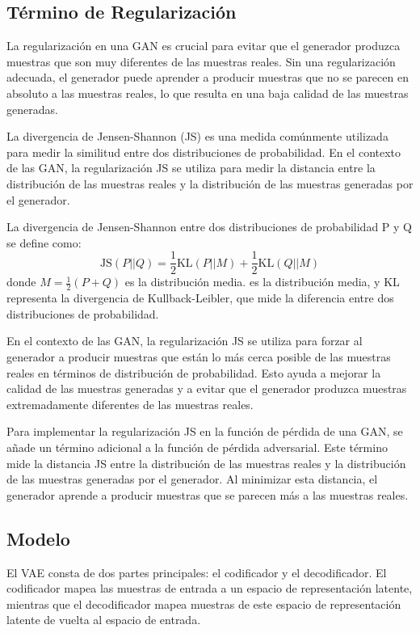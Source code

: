 \subsection{Término de Regularización}

La regularización en una GAN es crucial para evitar que el generador produzca muestras que son muy diferentes de las muestras reales. Sin una regularización adecuada, el generador puede aprender a producir muestras que no se parecen en absoluto a las muestras reales, lo que resulta en una baja calidad de las muestras generadas.

La divergencia de Jensen-Shannon (JS) es una medida comúnmente utilizada para medir la similitud entre dos distribuciones de probabilidad. En el contexto de las GAN, la regularización JS se utiliza para medir la distancia entre la distribución de las muestras reales y la distribución de las muestras generadas por el generador.

La divergencia de Jensen-Shannon entre dos distribuciones de probabilidad P y Q se define como: 
\begin{equation}
\text{JS}(P || Q) = \frac{1}{2} \text{KL}(P || M) + \frac{1}{2} \text{KL}(Q || M)
\end{equation}
donde \( M = \frac{1}{2}(P + Q) \) es la distribución media.
es la distribución media, y KL representa la divergencia de Kullback-Leibler, que mide la diferencia entre dos distribuciones de probabilidad.

En el contexto de las GAN, la regularización JS se utiliza para forzar al generador a producir muestras que están lo más cerca posible de las muestras reales en términos de distribución de probabilidad. Esto ayuda a mejorar la calidad de las muestras generadas y a evitar que el generador produzca muestras extremadamente diferentes de las muestras reales.

Para implementar la regularización JS en la función de pérdida de una GAN, se añade un término adicional a la función de pérdida adversarial. Este término mide la distancia JS entre la distribución de las muestras reales y la distribución de las muestras generadas por el generador. Al minimizar esta distancia, el generador aprende a producir muestras que se parecen más a las muestras reales.

\subsection{Modelo}

El VAE consta de dos partes principales: el codificador y el decodificador. El codificador mapea las muestras de entrada a un espacio de representación latente, mientras que el decodificador mapea muestras de este espacio de representación latente de vuelta al espacio de entrada.

